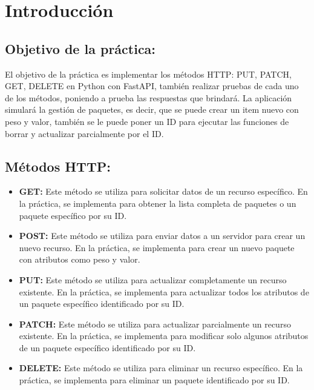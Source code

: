 \documentclass[12pt]{article}
\begin{document}
\section*{Introducción}
\subsection*{Objetivo de la práctica:}
El objetivo de la práctica es implementar los métodos HTTP: PUT, PATCH, GET, DELETE en Python con FastAPI, también realizar pruebas de cada uno de los métodos, poniendo a prueba las respuestas que brindará. La aplicación simulará la gestión de paquetes, es decir, que se puede crear un item nuevo con peso y valor, también se le puede poner un ID para ejecutar las funciones de borrar y actualizar parcialmente por el ID. \\


\subsection*{Métodos HTTP:}
\begin{itemize}
    \item \textbf{GET:} Este método se utiliza para solicitar datos de un recurso específico. En la práctica, se implementa para obtener la lista completa de paquetes o un paquete específico por su ID.
    \item \textbf{POST:} Este método se utiliza para enviar datos a un servidor para crear un nuevo recurso. En la práctica, se implementa para crear un nuevo paquete con atributos como peso y valor.
    \item \textbf{PUT:} Este método se utiliza para actualizar completamente un recurso existente. En la práctica, se implementa para actualizar todos los atributos de un paquete específico identificado por su ID.
    \item \textbf{PATCH:} Este método se utiliza para actualizar parcialmente un recurso existente. En la práctica, se implementa para modificar solo algunos atributos de un paquete específico identificado por su ID.
    \item \textbf{DELETE:} Este método se utiliza para eliminar un recurso específico. En la práctica, se implementa para eliminar un paquete identificado por su ID. \cite{ref1}
\end{itemize}
\end{document}
